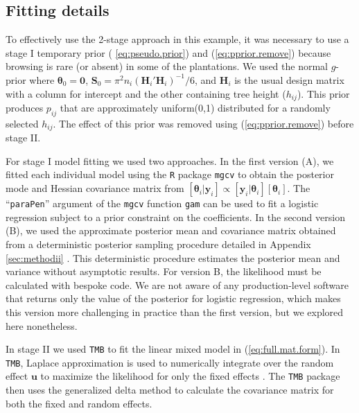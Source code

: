\documentclass[12pt]{article}
\newcommand{\by}{\mathbf{y}}
\newcommand{\bt}{\boldsymbol{\theta}}
\newcommand{\bS}{\mathbf{S}}
\newcommand{\bu}{\mathbf{u}}
\begin{document}
\subsection{Fitting details}

To effectively use the 2-stage approach in this example, it was necessary to use a stage I temporary prior ( \ref{eq:pseudo.prior}) and (\ref{eq:pprior.remove}) because browsing is rare (or absent) in some of the plantations. We used the normal $g$-prior \citep{hanson2014informative} where $\bt_0 = \mathbf{0}$, $\bS_0 = \pi^2 n_i (\mathbf{H}_i'\mathbf{H}_i)^{-1}/6$, and $\mathbf{H}_i$ is the usual design matrix with a column for intercept and the other containing tree height ($h_{ij}$). This prior produces $p_{ij}$ that are approximately uniform(0,1) distributed for a randomly selected  $h_{ij}$. The effect of this prior was removed using (\ref{eq:pprior.remove}) before stage II.

For stage I model fitting we used two approaches. In the first version (A), we fitted each individual model using the {\tt R} package {\tt mgcv} \citep{wood2011fast} to obtain the posterior mode and Hessian covariance matrix from $[\bt_i|\by_i] \propto [\by_i|\bt_i][\bt_i]$. The ``{\tt paraPen}'' argument of the {\tt mgcv} function {\tt gam} can be used to fit a logistic regression subject to a prior constraint on the coefficients. In the second version (B), we used the approximate posterior mean and covariance matrix obtained from a deterministic posterior sampling procedure detailed in Appendix \ref{sec:methodii} \citep{johnson2011bayesian,Rue:2009uq}. This deterministic procedure estimates the posterior mean and variance without asymptotic results. For version B, the likelihood must be calculated with bespoke code. We are not aware of any production-level software that returns only the value of the posterior for logistic regression, which makes this version more challenging in practice than the first version, but we explored here nonetheless.  

In stage II we used {\tt TMB} to fit the linear mixed model in (\ref{eq:full.mat.form}). In {\tt TMB}, Laplace approximation is used to numerically integrate over the random effect $\bu$ to maximize the likelihood for only the fixed effects \citep{kristensen2016tmb}. The {\tt TMB} package then uses the generalized delta method to calculate the covariance matrix for both the fixed and random effects. 
\end{document}
